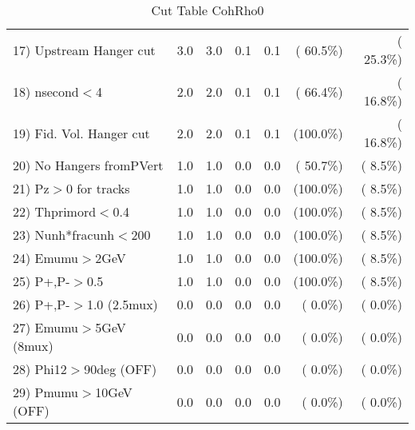 \begin{table}[h!]
\begin{tabular}{||l||r|r|r|r|r|r||}
 17) Upstream Hanger cut  &          3.0 &          3.0 &          0.1 &          0.1 & ( 60.5\%) & ( 25.3\%) \\
 18) nsecond$<$4          &          2.0 &          2.0 &          0.1 &          0.1 & ( 66.4\%) & ( 16.8\%) \\
 19) Fid. Vol. Hanger cut &          2.0 &          2.0 &          0.1 &          0.1 & (100.0\%) & ( 16.8\%) \\
 20) No Hangers fromPVert &          1.0 &          1.0 &          0.0 &          0.0 & ( 50.7\%) & (  8.5\%) \\
 21) Pz$>$0 for tracks    &          1.0 &          1.0 &          0.0 &          0.0 & (100.0\%) & (  8.5\%) \\
 22) Thprimord$<$0.4      &          1.0 &          1.0 &          0.0 &          0.0 & (100.0\%) & (  8.5\%) \\
 23) Nunh*fracunh$<$200   &          1.0 &          1.0 &          0.0 &          0.0 & (100.0\%) & (  8.5\%) \\
 24) Emumu$>$2GeV         &          1.0 &          1.0 &          0.0 &          0.0 & (100.0\%) & (  8.5\%) \\
 25) P+,P-$>$0.5          &          1.0 &          1.0 &          0.0 &          0.0 & (100.0\%) & (  8.5\%) \\
 26) P+,P-$>$1.0 (2.5mux) &          0.0 &          0.0 &          0.0 &          0.0 & (  0.0\%) & (  0.0\%) \\
 27) Emumu$>$5GeV  (8mux) &          0.0 &          0.0 &          0.0 &          0.0 & (  0.0\%) & (  0.0\%) \\
 28) Phi12$>$90deg  (OFF) &          0.0 &          0.0 &          0.0 &          0.0 & (  0.0\%) & (  0.0\%) \\
 29) Pmumu$>$10GeV  (OFF) &          0.0 &          0.0 &          0.0 &          0.0 & (  0.0\%) & (  0.0\%) \\
 \hline
 \hline
 \end{tabular}
 \caption{Cut Table  CohRho0  }
 \label{tab-cutcohjpsi-mumu_cohrho0}
 \end{table}
